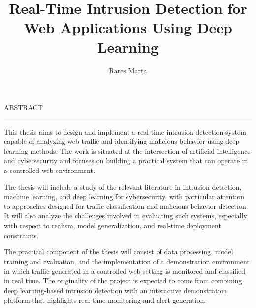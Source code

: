 \documentclass[12pt]{report}
\begin{document}
\title{Real-Time Intrusion Detection for Web Applications Using Deep Learning}					   
\author{Rares Marta}											
				
\maketitle


\newpage
\thispagestyle{empty}
\mbox{}
\newpage
{} 

\cleardoublepage
ABSTRACT
\vspace{0.5cm}	
\hrule
\vspace{0.5cm}	

This thesis aims to design and implement a real-time intrusion detection system capable of analyzing web traffic and identifying malicious behavior using deep learning methods. The work is situated at the intersection of artificial intelligence and cybersecurity and focuses on building a practical system that can operate in a controlled web environment.

The thesis will include a study of the relevant literature in intrusion detection, machine learning, and deep learning for cybersecurity, with particular attention to approaches designed for traffic classification and malicious behavior detection. It will also analyze the challenges involved in evaluating such systems, especially with respect to realism, model generalization, and real-time deployment constraints.

The practical component of the thesis will consist of data processing, model training and evaluation, and the implementation of a demonstration environment in which traffic generated in a controlled web setting is monitored and classified in real time. The originality of the project is expected to come from combining deep learning-based intrusion detection with an interactive demonstration platform that highlights real-time monitoring and alert generation.

\tableofcontents


\newpage
{}








\nocite{*}


\end{document}
